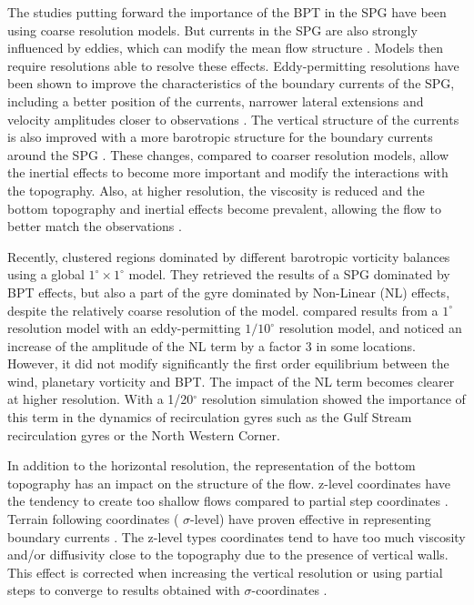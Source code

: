 \documentclass[os, manuscript]{copernicus}
\begin{document}
The studies putting forward the importance of the BPT in the SPG have been using coarse resolution models. But currents in the SPG are also strongly influenced by eddies, which can modify the mean flow structure \citep{MW08}. Models then require resolutions able to resolve these effects. Eddy-permitting resolutions have been shown to improve the characteristics of the boundary currents of the SPG, including a better position of the currents, narrower lateral extensions and velocity amplitudes closer to observations \citep{treguier2005,danek2019}. The vertical structure of the currents is also improved with a more barotropic structure for the boundary currents around the SPG \citep{marzocchi2015}. These changes, compared to coarser resolution models, allow the inertial effects to become more important and modify the interactions with the topography. Also, at higher resolution, the viscosity is reduced and the bottom topography and inertial effects become prevalent, allowing the flow to better match the observations \citep{spence2012, schoonover2016}. 

Recently, \citet{sonnewald2019} clustered regions dominated by different barotropic vorticity balances using a global $1^{\circ} \times 1^{\circ}$ model. They retrieved the results of a SPG dominated by BPT effects, but also a part of the gyre dominated by Non-Linear (NL) effects, despite the relatively coarse resolution of the model. \citet{yeager2015} compared results from a $1^{\circ}$ resolution model with an eddy-permitting $1/10^{\circ}$ resolution model, and noticed an increase of the amplitude of the NL term by a factor 3 in some locations. However, it did not modify significantly the first order equilibrium between the wind, planetary vorticity and BPT.  The impact of the NL term becomes clearer at higher resolution. With a 1/20$^{\circ}$ resolution simulation \citet{wang2017} showed the importance of this term in the dynamics of recirculation gyres such as the Gulf Stream recirculation gyres or the North Western Corner. 

In addition to the horizontal resolution, the representation of the bottom topography has an impact on the structure of the flow. z-level coordinates have the tendency to create too shallow flows compared to partial step coordinates \citep{pacanowski1998}. Terrain following coordinates ( $\sigma$-level) have proven effective in representing boundary currents \citep{schoonover2016,ezer2016}. The z-level types coordinates tend to have too much viscosity and/or diffusivity close to the topography due to the presence of vertical walls. This effect is corrected when increasing the vertical resolution or using partial steps to converge to results obtained with $\sigma$-coordinates \citep{ezer2004}.
\end{document}
